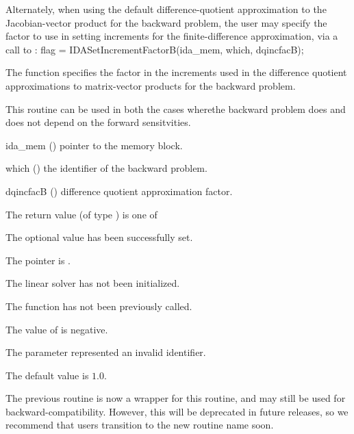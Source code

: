 Alternately, when using the default difference-quotient approximation
to the Jacobian-vector product for the backward problem, the user may
specify the factor to use in setting increments for the
finite-difference approximation, via a call to :
{
  flag = IDASetIncrementFactorB(ida\_mem, which, dqincfacB);
}
{
  The function  specifies the factor
  in the increments used in the difference quotient approximations to matrix-vector
  products for the backward problem.

  This routine can be used in both the cases wherethe backward problem
  does and does not depend on the forward sensitvities.
}
{
  \begin{args}
  \item[ida\_mem] ()
    pointer to the {\idas} memory block.
  \item[which] ()
    the identifier of the backward problem.
  \item[dqincfacB] ()
    difference quotient approximation factor.
  \end{args}
}
{
  The return value  (of type ) is one of
  \begin{args}
  \item[\Id{IDALS\_SUCCESS}]
    The optional value has been successfully set.
  \item[\Id{IDALS\_MEM\_NULL}]
    The  pointer is .
  \item[\Id{IDALS\_LMEM\_NULL}]
    The {\idals} linear solver has not been initialized.
  \item[\Id{IDALS\_NO\_ADJ}]
    The function  has not been previously called.
  \item[\Id{IDALS\_ILL\_INPUT}]
    The value of  is negative.
  \item[\Id{IDALS\_ILL\_INPUT}]
    The parameter  represented an invalid identifier.
  \end{args}
}
{
  The default value is $1.0$.

  The previous routine  is now a
  wrapper for this routine, and may still be used for
  backward-compatibility.  However, this will be deprecated in future
  releases, so we recommend that users transition to the new routine
  name soon.
}
